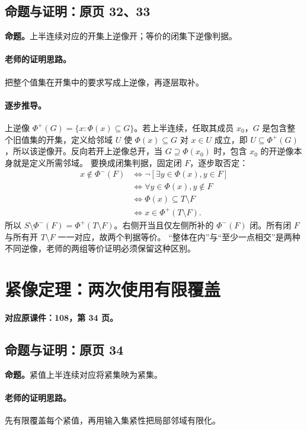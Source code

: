 \subsection{命题与证明：原页 32、33}

\textbf{命题。}上半连续对应的开集上逆像开；等价的闭集下逆像判据。

\paragraph{老师的证明思路。}把整个值集在开集中的要求写成上逆像，再逐层取补。

\paragraph{逐步推导。}
上逆像 $\Phi^+(G)=\{x:\Phi(x)\subseteq G\}$。若上半连续，任取其成员 $x_0$，$G$ 是包含整个旧值集的开集，定义给邻域 $U$ 使 $\Phi(x)\subseteq G$ 对 $x\in U$ 成立，即 $U\subseteq\Phi^+(G)$，所以该逆像开。反向若开上逆像总开，当 $G\supseteq\Phi(x_0)$ 时，包含 $x_0$ 的开逆像本身就是定义所需邻域。
要换成闭集判据，固定闭 $F$，逐步取否定：
\begin{align*}
x\notin\Phi^-(F)&\iff\neg[\exists y\in\Phi(x),y\in F]\\
&\iff\forall y\in\Phi(x),y\notin F\\
&\iff\Phi(x)\subseteq T\setminus F\\
&\iff x\in\Phi^+(T\setminus F).
\end{align*}
所以 $S\setminus\Phi^-(F)=\Phi^+(T\setminus F)$。右侧开当且仅左侧所补的 $\Phi^-(F)$ 闭。所有闭 $F$ 与所有开 $T\setminus F$ 一一对应，故两个判据等价。
“整体在内”与“至少一点相交”是两种不同逆像，老师的两组等价证明必须保留这种区别。


\clearpage\section{紧像定理：两次使用有限覆盖}\label{g:108:34}

\textbf{对应原课件：108，第 34 页。}



\subsection{命题与证明：原页 34}

\textbf{命题。}紧值上半连续对应将紧集映为紧集。

\paragraph{老师的证明思路。}先有限覆盖每个紧值，再用输入集紧性把局部邻域有限化。


